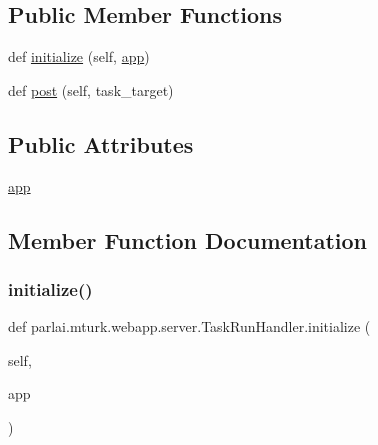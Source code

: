 \subsection*{Public Member Functions}
\begin{DoxyCompactItemize}
\item 
def \hyperlink{classparlai_1_1mturk_1_1webapp_1_1server_1_1TaskRunHandler_a110db01a938080c447a64b5a70918e25}{initialize} (self, \hyperlink{classparlai_1_1mturk_1_1webapp_1_1server_1_1TaskRunHandler_ae9e57d3ffed2fe707e9b1b041e65c2b7}{app})
\item 
def \hyperlink{classparlai_1_1mturk_1_1webapp_1_1server_1_1TaskRunHandler_a957a29eb2fcfec6fba5890470387e1d0}{post} (self, task\+\_\+target)
\end{DoxyCompactItemize}
\subsection*{Public Attributes}
\begin{DoxyCompactItemize}
\item 
\hyperlink{classparlai_1_1mturk_1_1webapp_1_1server_1_1TaskRunHandler_ae9e57d3ffed2fe707e9b1b041e65c2b7}{app}
\end{DoxyCompactItemize}


\subsection{Member Function Documentation}
\mbox{\label{classparlai_1_1mturk_1_1webapp_1_1server_1_1TaskRunHandler_a110db01a938080c447a64b5a70918e25}} 
\subsubsection{\texorpdfstring{initialize()}{initialize()}}
{\footnotesize\ttfamily def parlai.\+mturk.\+webapp.\+server.\+Task\+Run\+Handler.\+initialize (\begin{DoxyParamCaption}\item[{}]{self,  }\item[{}]{app }\end{DoxyParamCaption})}

